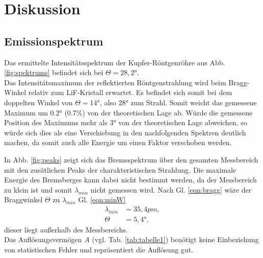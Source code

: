 \newpage
\section{Diskussion}
\subsection{Emissionspektrum}
Das ermittelte Intensitätsspektrum der Kupfer-Röntgenröhre aus Abb. \ref{fig:spektrums}
befindet sich bei $\Theta=28,2°$.\\
Das Intensitätsmaximum der reflektierten Röntgenstrahlung wird beim Bragg-Winkel relativ
zum LiF-Kristall erwartet. Es befindet sich somit bei dem doppelten Winkel von $\Theta=14°$, also $28$° 
zum Strahl. Somit weicht das gemessene Maximum um $0.2°$ (0.7\%) von der theoretischen Lage ab.
Würde die gemessene Position des Maximums mehr als 3° von der theoretischen Lage abweichen, so
würde sich dies als eine Verschiebung in den nachfolgenden Spektren deutlich machen, da somit auch alle Energie
um einen Faktor verschoben werden.

In Abb. \ref{fig:peaks} zeigt sich das Bremsspektrum über den gesamten Messbereich mit
den zusätlichen Peaks der charakteristischen Strahlung. Die maximale Energie des Bremsberges
kann dabei nicht bestimmt werden, da der Messbereich zu klein ist und somit  $\lambda_{min}$ 
nicht gemessen wird. Nach Gl. \ref{eqn:bragg} wäre der Braggwinkel $\Theta$ zu $\lambda_{min}$ Gl. \ref{eqn:minW}
\begin{align*}
    \lambda_{min}&=35,4\si{pm},\\
    \Theta&=5,4°,
\end{align*}
dieser liegt außerhalb des Messbereichs.\\
Das Auflösungsvermögen $A$ (vgl. Tab. \ref{tab:tabelle1}) benötigt keine Einbeziehung von statistischen
Fehler und repräsentiert die Auflösung gut.\\


